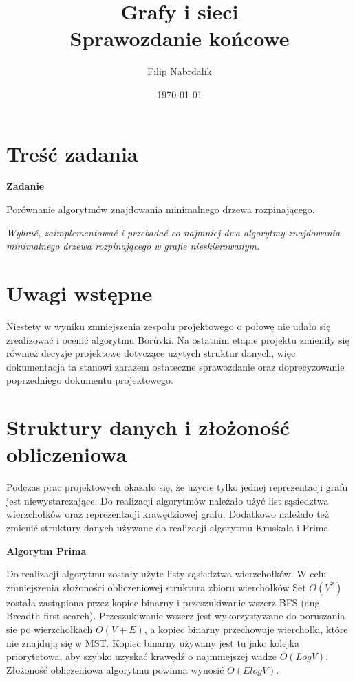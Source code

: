 \documentclass[a4paper, 10pt]{article}
\title{{\bf {Grafy i sieci}} \\ {\large Sprawozdanie końcowe}}
\date{\today}
\author{Filip Nabrdalik}
\begin{document}




\maketitle 




\newcommand{\ang}[1]{(ang.  #1\/)}
\newcommand{\e}[1]{{\em #1}\/}

\renewcommand*{\figurename}{Wykres}



\section{Treść zadania}

{\bf{Zadanie}}

Porównanie algorytmów znajdowania minimalnego drzewa rozpinającego.

{\it Wybrać, zaimplementować i przebadać co najmniej dwa algorytmy znajdowania minimalnego drzewa rozpinającego w grafie nieskierowanym. }

 

\section{Uwagi wstępne}

Niestety w wyniku zmniejszenia zespołu projektowego o połowę nie udało się zrealizować i ocenić algorytmu Borůvki. 
Na ostatnim etapie projektu zmieniły się również decyzje projektowe dotyczące użytych struktur danych, więc 
dokumentacja ta stanowi zarazem ostateczne sprawozdanie oraz doprecyzowanie poprzedniego dokumentu projektowego.



\section{Struktury danych i złożoność obliczeniowa}

Podczas prac projektowych okazało się, że użycie tylko jednej reprezentacji grafu jest niewystarczające. Do realizacji algorytmów należało użyć
list sąsiedztwa wierzchołków oraz reprezentacji krawędziowej grafu. Dodatkowo należało też zmienić struktury danych używane do realizacji algorytmu Kruskala
i Prima.


{\bf{Algorytm Prima}}
 
 Do realizacji algorytmu zostały użyte listy sąsiedztwa wierzchołków.
 W celu zmniejszenia złożoności obliczeniowej struktura zbioru wierchołków Set $O(V^2)$ została zastąpiona
 przez kopiec binarny\cite{kopiec} i przeszukiwanie wszerz BFS \ang{Breadth-first search}\cite{bfs}. Przeszukiwanie wszerz jest wykorzystywane do
 poruszania sie po wierzchołkach $O(V+E)$, a kopiec binarny przechowuje wierchołki, które nie znajdują się w MST. Kopiec binarny używany 
 jest tu jako kolejka priorytetowa, aby szybko uzyskać krawędź o najmniejszej wadze $O(LogV)$. Złożoność obliczeniowa algorytmu powinna wynosić
 $O(ElogV)$.
 
\end{document}
